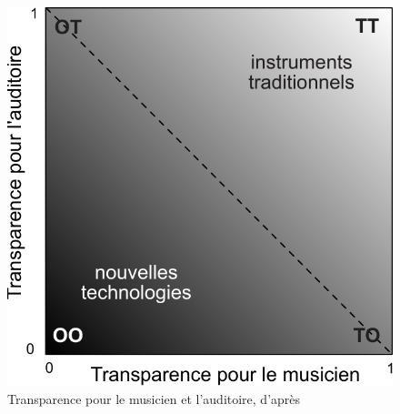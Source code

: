 \begin{figure}[!htbp]
	\captionsetup{format=plain}%
	\centering
	\begin{minipage}[t]{0.48\textwidth}
		\includegraphics[width=0.9\linewidth]{gfx/03_gesture/Fels-transparency.pdf}
		\caption{Transparence pour le musicien et l'auditoire, d'après \cite{fels_mapping_2002}}
		\label{fig:gesture:fels_transparency}
	\end{minipage}
	\hspace{.02\linewidth}
	\begin{minipage}[t]{0.48\textwidth}

\end{minipage}
\end{figure}
